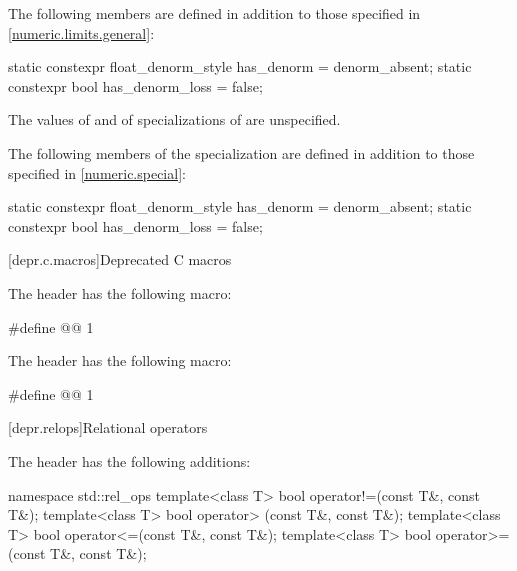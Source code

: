 \pnum
{}%
%
%
%
The following members are defined
in addition to those specified in \ref{numeric.limits.general}:
\begin{codeblock}
static constexpr float_denorm_style has_denorm = denorm_absent;
static constexpr bool has_denorm_loss = false;
\end{codeblock}

\pnum
The values of  and  of
specializations of  are unspecified.

\pnum
The following members of the specialization  are defined
in addition to those specified in \ref{numeric.special}:
%
%
\begin{codeblock}
static constexpr float_denorm_style has_denorm = denorm_absent;
static constexpr bool has_denorm_loss = false;
\end{codeblock}

[depr.c.macros]{Deprecated C macros}

\pnum
The header  has the following macro:
%
%
\begin{codeblock}
#define @@ 1
\end{codeblock}

\pnum
The header  has the following macro:
%
%
%
\begin{codeblock}
#define @@ 1
\end{codeblock}

[depr.relops]{Relational operators}%
%

\pnum
The header  has the following additions:

\begin{codeblock}
namespace std::rel_ops {
  template<class T> bool operator!=(const T&, const T&);
  template<class T> bool operator> (const T&, const T&);
  template<class T> bool operator<=(const T&, const T&);
  template<class T> bool operator>=(const T&, const T&);
}
\end{codeblock}

